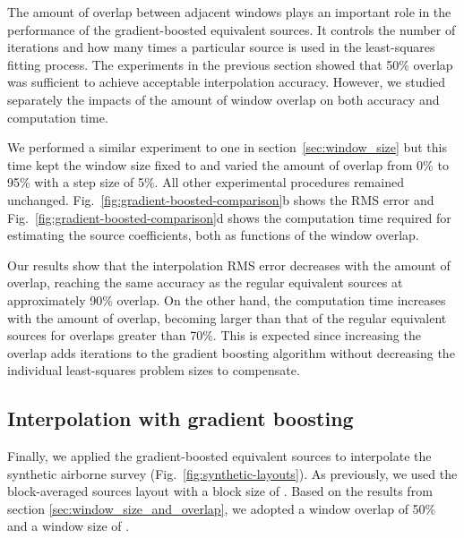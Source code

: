 The amount of overlap between adjacent windows plays an important role in the
performance of the gradient-boosted equivalent sources.
It controls the number of iterations and how many times a particular source is
used in the least-squares fitting process.
The experiments in the previous section showed that 50\% overlap was
sufficient to achieve acceptable interpolation accuracy.
However, we studied separately the impacts of the amount of window overlap on
both accuracy and computation time.

We performed a similar experiment to one in section~\ref{sec:window_size} but
this time kept the window size fixed to \BoostOverlappingWindowSize{} and
varied the amount of overlap from 0\% to 95\% with a step size of 5\%.
All other experimental procedures remained unchanged.
Fig.~\ref{fig:gradient-boosted-comparison}b shows the RMS error and
Fig.~\ref{fig:gradient-boosted-comparison}d shows the computation time
required for estimating the source coefficients, both as functions of
the window overlap.

Our results show that the interpolation RMS error decreases with the amount of
overlap, reaching the same accuracy as the regular equivalent sources at
approximately 90\% overlap.
On the other hand, the computation time increases with the amount of overlap,
becoming larger than that of the regular equivalent sources for overlaps
greater than 70\%.
This is expected since increasing the overlap adds iterations to the gradient
boosting algorithm without decreasing the individual least-squares problem
sizes to compensate.


\subsection{
    Interpolation with gradient boosting
}
\label{sec:gb_interpolation}

Finally, we applied the gradient-boosted equivalent sources to interpolate the
synthetic airborne survey (Fig.~\ref{fig:synthetic-layouts}).
As previously, we used the block-averaged sources layout with a block size of
\EqlBoostAirborneSpacing{}.
Based on the results from section \ref{sec:window_size_and_overlap}, we adopted
a window overlap of 50\% and a window size of \EqlBoostAirborneWindowSize{}.

